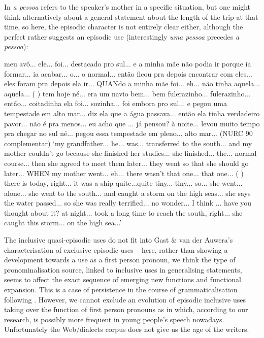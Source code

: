 \documentclass[output=paper]{langscibook}
\begin{document}
In   \textit{a pessoa} refers to the speaker’s mother in a specific situation, but one might think alternatively about a general statement about the length of the trip at that time, so here, the episodic character is not entirely clear either, although the perfect rather suggests an episodic use (interestingly \textit{uma pessoa} {precedes} \textit{a pessoa}):



\eanoraggedright\label{ex:amaral:39}
meu avô... ele... foi... destacado pro sul... e a minha mãe não podia ir porque ia formar... ia acabar... o... o normal... então ficou pra depois encontrar com eles... eles foram pra depois ela ir... QUANdo a minha mãe foi... eh... não tinha aquela... aquela... ( ) tem hoje né... era um navio bem... bem fulerazinho... fulerazinho... então... coitadinha ela foi... sozinha... foi embora pro sul... e pegou uma tempestade em alto mar... diz ela que a água passava... então ela tinha verdadeiro pavor... não é pra menos... eu acho que  ... já pensou? à noite...  levou muito tempo pra chegar no sul né... pegou essa tempestade em pleno... alto mar... {(NURC 90 complementar)}
\glt ‘my grandfather... he... was... transferred to the south... and my mother couldn’t go because she finished her studies... she finished... the... normal course... then she agreed to meet them later... they went so that she should go later... WHEN my mother went... eh... there wasn’t that one... that one... ( ) there is today, right... it was a ship quite...quite tiny... tiny... so... she went... alone... she went to the south... and caught a storm on the high seas... she says the water passed... so she was really terrified... no wonder... I think  ... have you thought about it? at night...  took a long time to reach the south, right... she caught this storm... on the high sea...’
\z 


The inclusive quasi-episodic uses do not fit into Gast \& van der Auwera’s characterisation of exclusive episodic uses – here, rather than showing a development towards a use as a first person pronoun, we think the type of pronominalisation source, linked to inclusive uses in generalising statements, seems to affect the exact sequence of emerging new functions and functional expansion. This is a case of persistence in the course of grammaticalisation following \citet{Hopper1991}. However, we cannot exclude an evolution of episodic inclusive uses taking over the function of first person pronouns as in  which, according to our research, is possibly more frequent in young people’s speech nowadays. Unfortunately the Web/dialects corpus does not give us the age of the writers. 
\end{document}
